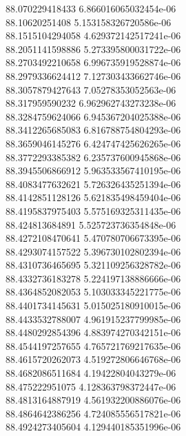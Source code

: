 {88.070229418433 6.866016065032454e-06 \\
88.10620251408 5.153158326720586e-06 \\
88.1515104294058 4.629372142517241e-06 \\
88.2051141598886 5.273395800031722e-06 \\
88.2703492210658 6.996735919528874e-06 \\
88.2979336624412 7.127303433662746e-06 \\
88.3057879427643 7.05278353052563e-06 \\
88.317959590232 6.962962743273238e-06 \\
88.3284759624066 6.945367204025388e-06 \\
88.3412265685083 6.816788754804293e-06 \\
88.3659046145276 6.424747425626265e-06 \\
88.3772293385382 6.235737600945868e-06 \\
88.3945506866912 5.963533567410195e-06 \\
88.4083477632621 5.726326435251394e-06 \\
88.4142851128126 5.621835498459404e-06 \\
88.4195837975403 5.575169325311435e-06 \\
88.424813684891 5.525723736354848e-06 \\
88.4272108470641 5.470780706673395e-06 \\
88.4293074157522 5.396730102802394e-06 \\
88.4310736465695 5.321109256328782e-06 \\
88.4332736183278 5.224197138886666e-06 \\
88.4364852082053 5.103033345221775e-06 \\
88.4401734145631 5.015025180910015e-06 \\
88.4433532788007 4.961915237799985e-06 \\
88.4480292854396 4.883974270342151e-06 \\
88.4544197257655 4.765721769217635e-06 \\
88.4615720262073 4.519272806646768e-06 \\
88.4682086511684 4.19422804043279e-06 \\
88.475222951075 4.128363798372447e-06 \\
88.4813164887919 4.561932200886076e-06 \\
88.4864642386256 4.724085556517821e-06 \\
88.4924273405604 4.129440185351996e-06 \\
}
